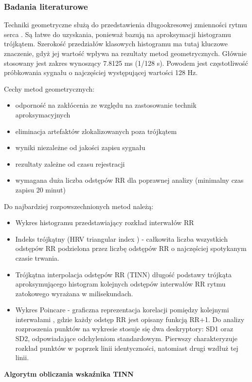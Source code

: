 \documentclass[a4paper, 11pt]{article}
\begin{document}
\subsubsection{Badania literaturowe}
\label{sec:hrv2:papers}

Techniki geometryczne służą do przedstawienia długookresowej zmienności
rytmu serca \cite{hrv2-pl}. Są łatwe do uzyskania, ponieważ bazują na aproksymacji
histogramu trójkątem. Szerokość przedziałów klasowych histogramu ma
tutaj kluczowe znaczenie, gdyż jej wartość wpływa na rezultaty metod
geometrycznych. Głównie stosowany jest zakres wynoszący 7.8125 ms
(1/128 s). Powodem jest częstotliwość próbkowania sygnału o najczęściej
występującej wartości 128 Hz.

Cechy metod geometrycznych: 
\begin{itemize}
\item odporność na zakłócenia ze względu na zastosowanie technik aproksymacyjnych
\item eliminacja artefaktów zlokalizowanych poza trójkątem 
\item wyniki niezależne od jakości zapisu sygnału 
\item rezultaty zależne od czasu rejestracji 
\item wymagana duża liczba odstępów RR dla poprawnej analizy (minimalny
czas zapisu \textendash{} 20 minut) 
\end{itemize}
Do najbardziej rozpowszechnionych metod należą: 
\begin{itemize}
\item Wykres histogramu przedstawiający rozkład interwałów RR
\item Indeks trójkątny (HRV triangular index ) - całkowita liczba wszystkich
odstępów RR podzielona przez liczbę odstępów RR o najczęściej spotykanym
czasie trwania. 
\item Trójkątna interpolacja odstępów RR (TINN) \textendash{} długość podstawy
trójkąta aproksymującego histogram kolejnych odstępów interwałów RR
rytmu zatokowego wyrażana w milisekundach. 
\item Wykres Poincare - graficzna reprezentacja korelacji pomiędzy kolejnymi
interwałami , gdzie każdy odstęp RR jest opisany funkcją RR+1. Do
analizy rozproszenia punktów na wykresie stosuje się dwa deskryptory:
SD1 oraz SD2, odpowiadające odchyleniom standardowym. Pierwszy charakteryzuje
rozkład punktów w poprzek linii identyczności, natomiast drugi wzdłuż
tej linii.
\end{itemize}
\textbf{Algorytm obliczania wskaźnika TINN \cite{hrv2-eng}}
\end{document}
